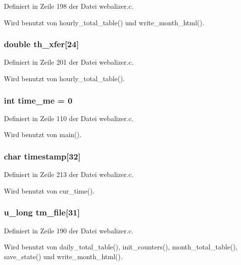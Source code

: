 Definiert in Zeile 198 der Datei webalizer.c.

Wird benutzt von hourly\_\-total\_\-table() und write\_\-month\_\-html().
\subsubsection{\setlength{\rightskip}{0pt plus 5cm}double {\bf th\_\-xfer}[24]}\label{webalizer_8c_a063714cc339793854ef49bb72c4382b}




Definiert in Zeile 201 der Datei webalizer.c.

Wird benutzt von hourly\_\-total\_\-table().
\subsubsection{\setlength{\rightskip}{0pt plus 5cm}int {\bf time\_\-me} = 0}\label{webalizer_8c_445501b8b84e1293820c0142acd34113}




Definiert in Zeile 110 der Datei webalizer.c.

Wird benutzt von main().
\subsubsection{\setlength{\rightskip}{0pt plus 5cm}char {\bf timestamp}[32]}\label{webalizer_8c_17cd1753a5a06a50ec97b8e85f56af0e}




Definiert in Zeile 213 der Datei webalizer.c.

Wird benutzt von cur\_\-time().
\subsubsection{\setlength{\rightskip}{0pt plus 5cm}u\_\-long {\bf tm\_\-file}[31]}\label{webalizer_8c_985c7f07bdd01aea04be87abba0d225b}




Definiert in Zeile 190 der Datei webalizer.c.

Wird benutzt von daily\_\-total\_\-table(), init\_\-counters(), month\_\-total\_\-table(), save\_\-state() und write\_\-month\_\-html().
